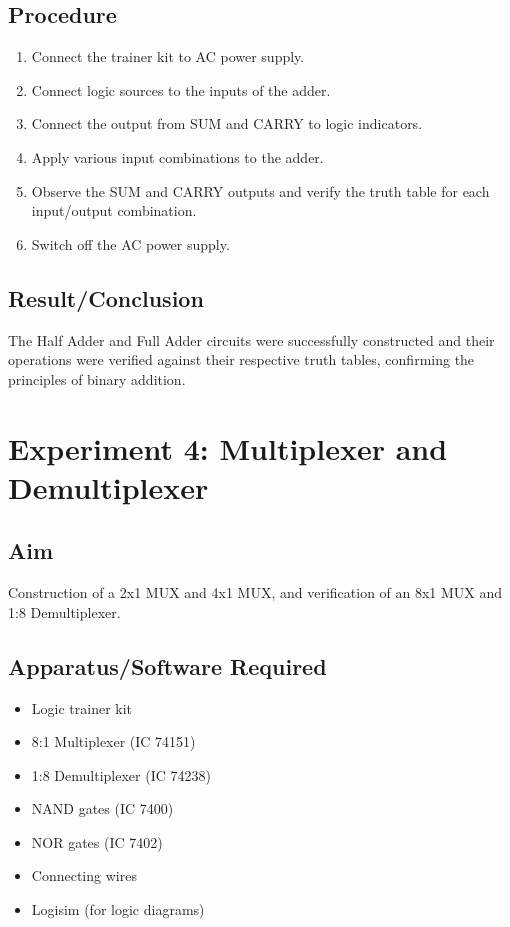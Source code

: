 \documentclass[11pt]{article}
\begin{document}
\subsection{Procedure}
\begin{enumerate}
    \item Connect the trainer kit to AC power supply.
    \item Connect logic sources to the inputs of the adder.
    \item Connect the output from SUM and CARRY to logic indicators.
    \item Apply various input combinations to the adder.
    \item Observe the SUM and CARRY outputs and verify the truth table for each input/output combination.
    \item Switch off the AC power supply.
\end{enumerate}

\subsection{Result/Conclusion}
The Half Adder and Full Adder circuits were successfully constructed and their operations were verified against their respective truth tables, confirming the principles of binary addition.

\newpage
\section{Experiment 4: Multiplexer and Demultiplexer}

\subsection{Aim}
Construction of a 2x1 MUX and 4x1 MUX, and verification of an 8x1 MUX and 1:8 Demultiplexer.

\subsection{Apparatus/Software Required}
\begin{itemize}
    \item Logic trainer kit
    \item 8:1 Multiplexer (IC 74151)
    \item 1:8 Demultiplexer (IC 74238)
    \item NAND gates (IC 7400)
    \item NOR gates (IC 7402)
    \item Connecting wires
    \item Logisim (for logic diagrams)
\end{itemize}
\end{document}
